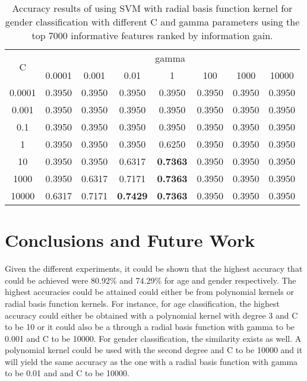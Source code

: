 \documentclass[a4paper]{llncs}
\begin{document}
\begin{table}[!htbp]
\centering
\begin{tabular}{|c|c|c|c|c|c|c|c|}
\hline
\multirow{2}{*}{C} & \multicolumn{7}{c|}{gamma}                                                     \\ \cline{2-8} 
                   & 0.0001 & 0.001  & 0.01            & 1               & 100    & 1000   & 10000  \\ \hline
0.0001             & 0.3950 & 0.3950 & 0.3950          & 0.3950          & 0.3950 & 0.3950 & 0.3950 \\ \hline
0.001              & 0.3950 & 0.3950 & 0.3950          & 0.3950          & 0.3950 & 0.3950 & 0.3950 \\ \hline
0.1                & 0.3950 & 0.3950 & 0.3950          & 0.3950          & 0.3950 & 0.3950 & 0.3950 \\ \hline
1                  & 0.3950 & 0.3950 & 0.3950          & 0.6250          & 0.3950 & 0.3950 & 0.3950 \\ \hline
10                 & 0.3950 & 0.3950 & 0.6317          & \textbf{0.7363} & 0.3950 & 0.3950 & 0.3950 \\ \hline
1000               & 0.3950 & 0.6317 & 0.7171          & \textbf{0.7363} & 0.3950 & 0.3950 & 0.3950 \\ \hline
10000              & 0.6317 & 0.7171 & \textbf{0.7429} & \textbf{0.7363} & 0.3950 & 0.3950 & 0.3950 \\ \hline
\end{tabular}
\caption{Accuracy results of using SVM with radial basis function kernel for gender classification with different C and gamma parameters using the top 7000 informative features ranked by information gain.}
\label{table:SVMRBFGender}
\end{table}
\section{Conclusions and Future Work}
Given the different experiments, it could be shown that the highest accuracy that could be achieved were 80.92\% and 74.29\% for age and gender respectively. The highest accuracies could be attained could either be from polynomial kernels or radial basis function kernels. For instance, for age classification, the highest accuracy could either be obtained with a polynomial kernel with degree 3 and C to be 10 or it could also be a through a radial basis function with gamma to be 0.001 and C to be 10000. For gender classification, the similarity exists as well. A polynomial kernel could be used with the second degree and C to be 10000 and it will yield the same accuracy as the one with a radial basis function with gamma to be 0.01 and and C to be 10000. 
\end{document}
